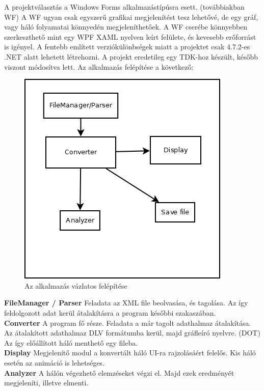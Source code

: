 A projektválasztás a Windows Forms alkalmazástípúsra esett. (továbbiakban WF) A WF ugyan csak egyszerű grafikai megjelenítést tesz lehetővé, de egy gráf, vagy háló folyamatai könnyedén megjeleníthetőek. A WF cserébe könnyebben szerkeszthető mint egy WPF XAML nyelven leírt felülete, és kevesebb erőforrást is igényel. 
\newpage
{}
A fentebb említett verziókülönbségek miatt a projektet csak 4.7.2-es .NET alatt lehetett létrehozni. A projekt eredetileg egy TDK-hoz készült, később viszont módosítva lett. Az alkalmazás felépítése a következő: 

\begin{figure}[h!]
\centering
\includegraphics[scale=0.6]{images/scheme.png}
\caption{Az alkalmazás vázlatos felépítése}
\label{fig:scheme}
\end{figure}

\textbf{FileManager / Parser } Feladata az XML file beolvasása, és tagolása. Az így feldolgozott adat kerül átalakításra a program későbbi szakaszában.\\
\textbf{Converter} A program fő része. Feladata a már tagolt adathalmaz átalakítása. Az átalakított adathalmaz DLV formátumba kerül, majd gráfleíró nyelvre. (DOT) Az így előállított háló menthető egy fileba.\\
\textbf{Display} Megjelenítő modul a konvertált háló UI-ra rajzolásáért felelős. Kis háló esetén az animáció is lehetséges.\\
\textbf{Analyzer} A hálón végezhető elemzéseket végzi el. Majd ezek eredményét megjeleníti, illetve elmenti. 

